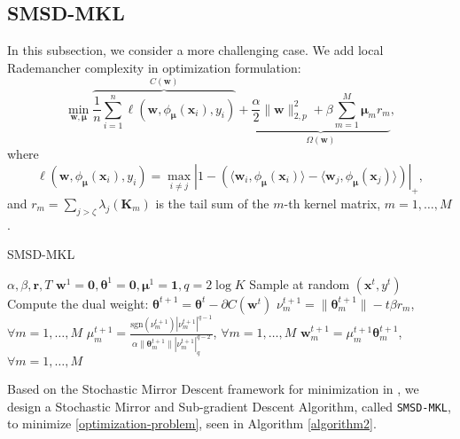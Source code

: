 \documentclass{article}
\begin{document}
\subsection{SMSD-MKL}
In this subsection, we consider a more challenging case.
We add local Rademancher complexity in optimization formulation:
\begin{equation}
\label{optimization-problem}
    \min_{\mathbf w,\bm \mu}
    \overbrace{\frac{1}{n}\sum_{i=1}^n\ell(\mathbf w,\phi_{\bm \mu}(\mathbf{x}_i), y_i)}^{C(\mathbf w)}
    +\underbrace{\frac{\alpha}{2}\|\mathbf w\|_{2,p}^2
    +\beta\sum_{m=1}^M\mathbf{\mu}_mr_m}_{\Omega(\mathbf w)},
\end{equation}
where
$$\ell(\mathbf w,\phi_{\bm \mu}(\mathbf{x}_i), y_i)=
\max\limits_{i \not= j}\left|1-\left(\langle\mathbf w_i,
\phi_{\bm \mu}(\mathbf{x}_i)\rangle -\langle\mathbf w_j, \phi_{\bm \mu}(\mathbf{x}_j)\rangle\right)\right|_+,$$
and
$r_m=\sum_{j>\zeta}\lambda_j(\mathbf{K}_m)$ is the tail sum of the $m$-th kernel matrix,  $m=1,\ldots, M$.

\begin{algorithm}[t]
   \caption{SMSD-MKL}
   \label{algorithm2}
    \begin{algorithmic}
        $\alpha, \beta, \bm r, T$
        $\mathbf w^1=\mathbf{0}, \pmb{\theta}^1=\mathbf{0}, \bm \mu^1=\mathbf{1}, q=2\log K $
       \STATE Sample at random $(\mathbf{x}^t, y^t)$
       \STATE Compute the dual weight: $\pmb{\theta}^{t+1}=\pmb{\theta}^t-\partial{C(\mathbf w^t)}$
       \STATE $\nu_m^{t+1}=\|\pmb{\theta}_m^{t+1}\|-t\beta r_m$, $\forall m=1,\ldots, M$
       \STATE $\mu_m^{t+1}=\frac{\mathrm{sgn}(\nu_m^{t+1})|\nu_m^{t+1}|^{q-1}}
       {\alpha\|\bm \theta_m^{t+1}\||\nu_m^{t+1}|_q^{q-2}}$, $\forall m=1,\ldots, M$
       \STATE $\mathbf{w}_m^{t+1}=\mu_m^{t+1} \pmb{\theta}_m^{t+1}$, $\forall m=1,\ldots, M$
       \ENDFOR
    \end{algorithmic}
\end{algorithm}

Based on the Stochastic Mirror Descent framework for minimization in \cite{Shalev-ShwartzT11, OrabonaL11},
we design a Stochastic Mirror and Sub-gradient Descent Algorithm, called \texttt{SMSD-MKL}, to minimize \eqref{optimization-problem},
seen in Algorithm \ref{algorithm2}.
\end{document}
